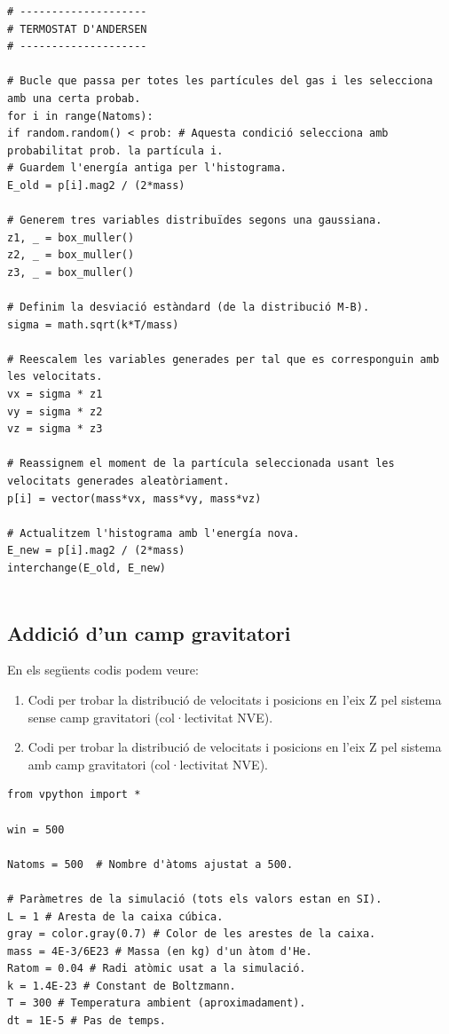 \documentclass[a4paper,10.5pt]{report}
\begin{document}
\begin{appendices}
\begin{lstlisting}[caption={Distribució d'energies, energia total del sistema en funció del temps i fluctuacions relatives en l'energia total amb el termostat d'Andersen implementat (col·lectivitat NVT, canònica).}]
# --------------------
# TERMOSTAT D'ANDERSEN
# --------------------

# Bucle que passa per totes les partícules del gas i les selecciona amb una certa probab.
for i in range(Natoms):
if random.random() < prob: # Aquesta condició selecciona amb probabilitat prob. la partícula i.
# Guardem l'energía antiga per l'histograma.
E_old = p[i].mag2 / (2*mass)

# Generem tres variables distribuïdes segons una gaussiana.
z1, _ = box_muller()
z2, _ = box_muller()
z3, _ = box_muller()

# Definim la desviació estàndard (de la distribució M-B).
sigma = math.sqrt(k*T/mass)

# Reescalem les variables generades per tal que es corresponguin amb les velocitats.
vx = sigma * z1
vy = sigma * z2
vz = sigma * z3

# Reassignem el moment de la partícula seleccionada usant les velocitats generades aleatòriament.
p[i] = vector(mass*vx, mass*vy, mass*vz)

# Actualitzem l'histograma amb l'energía nova.
E_new = p[i].mag2 / (2*mass)
interchange(E_old, E_new)
	
	\end{lstlisting}
	
	\subsection{Addició d'un camp gravitatori}
	\label{annex:a3}
	En els següents codis podem veure:
	\begin{enumerate}
		\item Codi per trobar la distribució de velocitats i posicions en l'eix Z pel sistema sense camp gravitatori (col·lectivitat NVE).
		\item Codi per trobar la distribució de velocitats i posicions en l'eix Z pel sistema amb camp gravitatori (col·lectivitat NVE).
	\end{enumerate}
	
	\begin{lstlisting}[caption={Distribució de velocitats i posicions en l'eix Z pel sistema sense camp gravitatori (col·lectivitat NVE).}]
from vpython import *

win = 500

Natoms = 500  # Nombre d'àtoms ajustat a 500.

# Paràmetres de la simulació (tots els valors estan en SI).
L = 1 # Aresta de la caixa cúbica.
gray = color.gray(0.7) # Color de les arestes de la caixa.
mass = 4E-3/6E23 # Massa (en kg) d'un àtom d'He.
Ratom = 0.04 # Radi atòmic usat a la simulació.
k = 1.4E-23 # Constant de Boltzmann.
T = 300 # Temperatura ambient (aproximadament).
dt = 1E-5 # Pas de temps.


\end{lstlisting}
\end{appendices}
\end{document}
